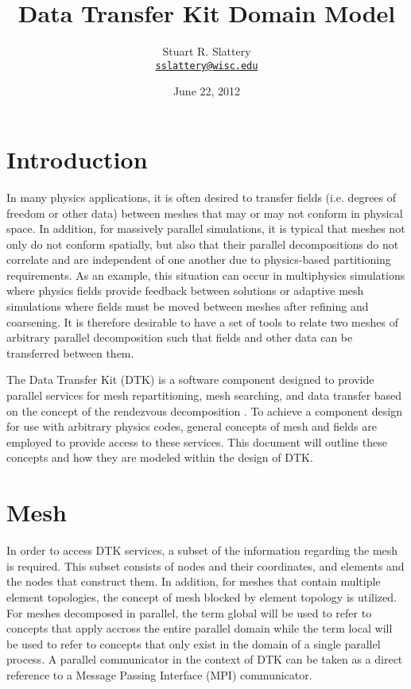 \documentclass[letterpaper]{article}
\author{Stuart R. Slattery
\\ \href{mailto:sslattery@wisc.edu}{\texttt{sslattery@wisc.edu}}
}
\date{June 22, 2012}
\title{Data Transfer Kit Domain Model}
\begin{document}
\maketitle

\section{Introduction}
In many physics applications, it is often desired to transfer fields
(i.e. degrees of freedom or other data) between meshes that may or may
not conform in physical space. In addition, for massively parallel
simulations, it is typical that meshes not only do not conform
spatially, but also that their parallel decompositions do not
correlate and are independent of one another due to physics-based
partitioning requirements. As an example, this situation can occur in
multiphysics simulations where physics fields provide feedback between
solutions or adaptive mesh simulations where fields must be moved
between meshes after refining and coarsening. It is therefore
desirable to have a set of tools to relate two meshes of arbitrary
parallel decomposition such that fields and other data can be
transferred between them.

The Data Transfer Kit (DTK) is a software component designed to
provide parallel services for mesh repartitioning, mesh searching, and
data transfer based on the concept of the rendezvous decomposition
\cite{Plimpton_2004}. To achieve a component design for use with
arbitrary physics codes, general concepts of mesh and fields are
employed to provide access to these services. This document will
outline these concepts and how they are modeled within the design of
DTK.

\section{Mesh}
In order to access DTK services, a subset of the information regarding
the mesh is required. This subset consists of nodes and their
coordinates, and elements and the nodes that construct them. In
addition, for meshes that contain multiple element topologies, the
concept of mesh blocked by element topology is utilized. For meshes
decomposed in parallel, the term global will be used to refer to
concepts that apply accross the entire parallel domain while the term
local will be used to refer to concepts that only exist in the domain
of a single parallel process. A parallel communicator in the context
of DTK can be taken as a direct reference to a Message Passing
Interface (MPI) communicator.
\end{document}
